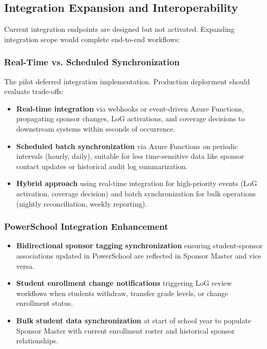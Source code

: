 \subsection{Integration Expansion and Interoperability}

Current integration endpoints are designed but not activated. Expanding integration scope would complete end-to-end workflows:

\subsubsection{Real-Time vs. Scheduled Synchronization}

The pilot deferred integration implementation. Production deployment should evaluate trade-offs:

\begin{itemize}
    \item \textbf{Real-time integration} via webhooks or event-driven Azure Functions, propagating sponsor changes, LoG activations, and coverage decisions to downstream systems within seconds of occurrence.
    \item \textbf{Scheduled batch synchronization} via Azure Functions on periodic intervals (hourly, daily), suitable for less time-sensitive data like sponsor contact updates or historical audit log summarization.
    \item \textbf{Hybrid approach} using real-time integration for high-priority events (LoG activation, coverage decision) and batch synchronization for bulk operations (nightly reconciliation, weekly reporting).
\end{itemize}

\subsubsection{PowerSchool Integration Enhancement}

\begin{itemize}
    \item \textbf{Bidirectional sponsor tagging synchronization} ensuring student-sponsor associations updated in PowerSchool are reflected in Sponsor Master and vice versa.
    \item \textbf{Student enrollment change notifications} triggering LoG review workflows when students withdraw, transfer grade levels, or change enrollment status.
    \item \textbf{Bulk student data synchronization} at start of school year to populate Sponsor Master with current enrollment roster and historical sponsor relationships.
\end{itemize}

